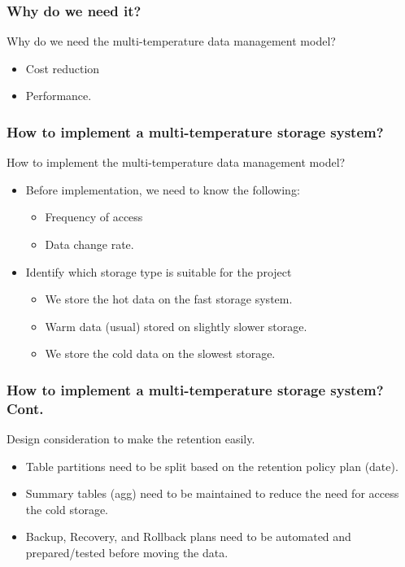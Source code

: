 \begin{frame}
\frametitle{Why do we need it?}

\begin{wideitemize}
\item Why do we need the multi-temperature data management model?
\begin{itemize}[<+->]
\item Cost reduction \blue{\faDollar \faDollar \faDollar \faDollar}
\item Performance.
\end{itemize}
\end{wideitemize}
\end{frame}

\begin{frame}
\frametitle{How to implement a multi-temperature storage system? }

\begin{wideitemize}
\item How to implement the multi-temperature data management model?
\begin{itemize}[<+->]
\item Before implementation, we need to know the following:
\begin{itemize}[<+->]
\item Frequency of access
\item Data change rate.
\end{itemize}
\item Identify which storage type is suitable for the project
\begin{itemize}[<+->]
\item We store the hot data on the fast storage system.
\item Warm data (usual) stored on slightly slower storage.
\item We store the cold data on the slowest storage.
\end{itemize}
\end{itemize}
\end{wideitemize}
\end{frame}


\begin{frame}
\frametitle{How to implement a multi-temperature storage system? Cont.}

\begin{wideitemize}
\item Design consideration to make the retention easily.
\begin{itemize}[<+->]
\item Table partitions need to be split based on the retention policy plan \forexample (date).
\item Summary tables (agg) need to be maintained to reduce the need for access the cold storage.
\item Backup, Recovery, and Rollback plans need to be automated and prepared/tested before moving the data.
\end{itemize}
\end{wideitemize}
\end{frame}

